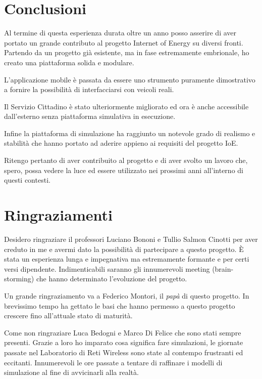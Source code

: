 \chapter{Conclusioni}

Al termine di questa esperienza durata oltre un anno posso asserire di aver portato un grande contributo al progetto Internet of Energy su diversi fronti. Partendo da un progetto già esistente, ma in fase estremamente embrionale, ho creato una piattaforma solida e modulare. 

L'applicazione mobile è passata da essere uno strumento puramente dimostrativo a fornire la possibilità di interfacciarsi con veicoli reali.

Il Servizio Cittadino è stato ulteriormente migliorato ed ora è anche accessibile dall'esterno senza piattaforma simulativa in esecuzione.

Infine la piattaforma di simulazione ha raggiunto un notevole grado di realismo e stabilità che hanno portato ad aderire appieno ai requisiti del progetto IoE. 

Ritengo pertanto di aver contribuito al progetto e di aver svolto un lavoro che, spero, possa vedere la luce ed essere utilizzato nei prossimi anni all'interno di questi contesti.


\chapter{Ringraziamenti}

Desidero ringraziare il professori Luciano Bononi e Tullio Salmon Cinotti per aver creduto in me e avermi dato la possibilità di partecipare a questo progetto. È stata un esperienza lunga e impegnativa ma estremamente formante e per certi versi dipendente. Indimenticabili saranno gli innumerevoli meeting (brain-storming) che hanno determinato l'evoluzione del progetto.

Un grande ringraziamento va a Federico Montori, il \emph{papà} di questo progetto. In brevissimo tempo ha gettato le basi che hanno permesso a questo progetto crescere fino all'attuale stato di maturità.

Come non ringraziare Luca Bedogni e Marco Di Felice che sono stati sempre presenti. Grazie a loro ho imparato cosa significa fare simulazioni, le giornate passate nel Laboratorio di Reti Wireless sono state al contempo frustranti ed eccitanti. Innumerevoli le ore passate a tentare di raffinare i modelli di simulazione al fine di avvicinarli alla realtà.

